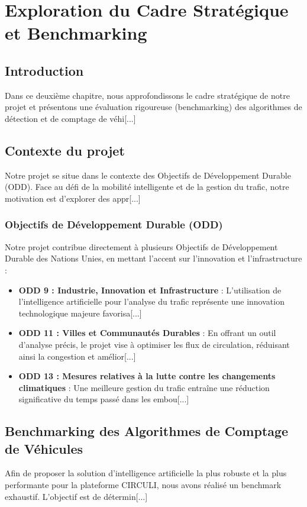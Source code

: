 \chapter{Exploration du Cadre Stratégique et Benchmarking}

\section{Introduction}
Dans ce deuxième chapitre, nous approfondissons le cadre stratégique de notre projet et présentons une évaluation rigoureuse (benchmarking) des algorithmes de détection et de comptage de véhi[...]

\section{Contexte du projet}
Notre projet se situe dans le contexte des Objectifs de Développement Durable (ODD). Face au défi de la mobilité intelligente et de la gestion du trafic, notre motivation est d'explorer des appr[...]

\subsection{Objectifs de Développement Durable (ODD)}
Notre projet contribue directement à plusieurs Objectifs de Développement Durable des Nations Unies, en mettant l'accent sur l'innovation et l'infrastructure :

\begin{itemize}
    \item \textbf{ODD 9 : Industrie, Innovation et Infrastructure} : L'utilisation de l'intelligence artificielle pour l'analyse du trafic représente une innovation technologique majeure favorisa[...]
    \item \textbf{ODD 11 : Villes et Communautés Durables} : En offrant un outil d'analyse précis, le projet vise à optimiser les flux de circulation, réduisant ainsi la congestion et amélior[...]
    \item \textbf{ODD 13 : Mesures relatives à la lutte contre les changements climatiques} : Une meilleure gestion du trafic entraîne une réduction significative du temps passé dans les embou[...]
\end{itemize}

\section{Benchmarking des Algorithmes de Comptage de Véhicules}
Afin de proposer la solution d'intelligence artificielle la plus robuste et la plus performante pour la plateforme CIRCULI, nous avons réalisé un benchmark exhaustif. L'objectif est de détermin[...]

